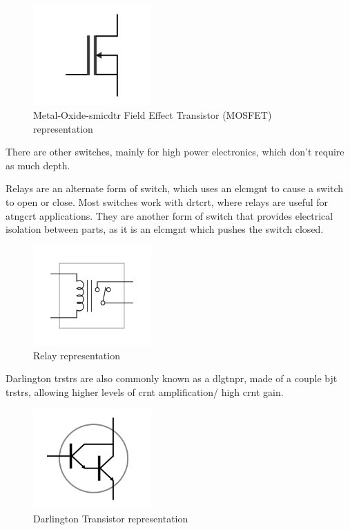 \documentclass[a4paper,11pt]{report}
\begin{document}
\begin{figure}[H]
\centering
\includegraphics[width=0.4\textwidth]{MOSFET}
\caption{Metal-Oxide-\gls{smicdtr} Field Effect Transistor (MOSFET) representation}
\end{figure}

There are other switches, mainly for high power electronics, which don't require as much depth.

Relays are an alternate form of switch, which uses an \gls{elcmgnt} to cause a switch to open or close. Most switches work with \gls{drtcrt}, where relays are useful for \gls{atngcrt} applications. They are another form of switch that provides electrical isolation between parts, as it is an \gls{elcmgnt} which pushes the switch closed.

\begin{figure}[H]
\centering
\includegraphics[width=0.4\textwidth]{relay}
\caption{Relay representation}
\end{figure}

Darlington \gls{trstr}s are also commonly known as a \gls{dlgtnpr}, made of a couple \gls{bjt} \gls{trstr}s, allowing higher levels of \gls{crnt} amplification/ high \gls{crnt} gain.

\begin{figure}[H]
\centering
\includegraphics[width=0.4\textwidth]{darlingtontransistor}
\caption{Darlington Transistor representation}
\end{figure}
\end{document}
